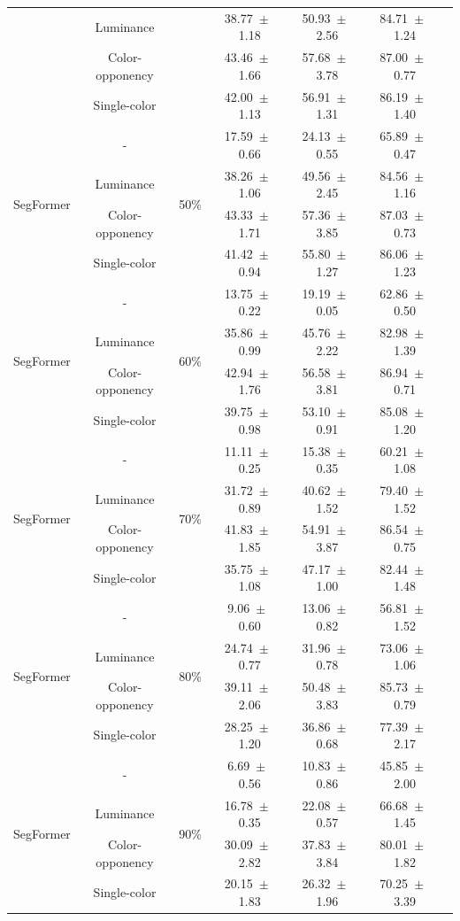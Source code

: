 \begin{table}[h]
\begin{tabular}{@{}lccc ccc@{}}
& Luminance & & 38.77~$\pm$~1.18 & 50.93~$\pm$~2.56 & 84.71~$\pm$~1.24 \\
& Color-opponency & & 43.46~$\pm$~1.66 & 57.68~$\pm$~3.78 & 87.00~$\pm$~0.77 \\
& Single-color & & 42.00~$\pm$~1.13 & 56.91~$\pm$~1.31 & 86.19~$\pm$~1.40 \\
\midrule
\multirow{4}{*}{SegFormer} & - & \multirow{4}{*}{50\%} & 17.59~$\pm$~0.66 & 24.13~$\pm$~0.55 & 65.89~$\pm$~0.47 \\
& Luminance & & 38.26~$\pm$~1.06 & 49.56~$\pm$~2.45 & 84.56~$\pm$~1.16 \\
& Color-opponency & & 43.33~$\pm$~1.71 & 57.36~$\pm$~3.85 & 87.03~$\pm$~0.73 \\
& Single-color & & 41.42~$\pm$~0.94 & 55.80~$\pm$~1.27 & 86.06~$\pm$~1.23 \\
\midrule
\multirow{4}{*}{SegFormer} & - & \multirow{4}{*}{60\%} & 13.75~$\pm$~0.22 & 19.19~$\pm$~0.05 & 62.86~$\pm$~0.50 \\
& Luminance & & 35.86~$\pm$~0.99 & 45.76~$\pm$~2.22 & 82.98~$\pm$~1.39 \\
& Color-opponency & & 42.94~$\pm$~1.76 & 56.58~$\pm$~3.81 & 86.94~$\pm$~0.71 \\
& Single-color & & 39.75~$\pm$~0.98 & 53.10~$\pm$~0.91 & 85.08~$\pm$~1.20 \\
\midrule
\multirow{4}{*}{SegFormer} & - & \multirow{4}{*}{70\%} & 11.11~$\pm$~0.25 & 15.38~$\pm$~0.35 & 60.21~$\pm$~1.08 \\
& Luminance & & 31.72~$\pm$~0.89 & 40.62~$\pm$~1.52 & 79.40~$\pm$~1.52 \\
& Color-opponency & & 41.83~$\pm$~1.85 & 54.91~$\pm$~3.87 & 86.54~$\pm$~0.75 \\
& Single-color & & 35.75~$\pm$~1.08 & 47.17~$\pm$~1.00 & 82.44~$\pm$~1.48 \\
\midrule
\multirow{4}{*}{SegFormer} & - & \multirow{4}{*}{80\%} & 9.06~$\pm$~0.60 & 13.06~$\pm$~0.82 & 56.81~$\pm$~1.52 \\
& Luminance & & 24.74~$\pm$~0.77 & 31.96~$\pm$~0.78 & 73.06~$\pm$~1.06 \\
& Color-opponency & & 39.11~$\pm$~2.06 & 50.48~$\pm$~3.83 & 85.73~$\pm$~0.79 \\
& Single-color & & 28.25~$\pm$~1.20 & 36.86~$\pm$~0.68 & 77.39~$\pm$~2.17 \\
\midrule
\multirow{4}{*}{SegFormer} & - & \multirow{4}{*}{90\%} & 6.69~$\pm$~0.56 & 10.83~$\pm$~0.86 & 45.85~$\pm$~2.00 \\
& Luminance & & 16.78~$\pm$~0.35 & 22.08~$\pm$~0.57 & 66.68~$\pm$~1.45 \\
& Color-opponency & & 30.09~$\pm$~2.82 & 37.83~$\pm$~3.84 & 80.01~$\pm$~1.82 \\
& Single-color & & 20.15~$\pm$~1.83 & 26.32~$\pm$~1.96 & 70.25~$\pm$~3.39 \\
\midrule
\bottomrule
\end{tabular}
\label{tab:sparse_results_segformer_acdc_rain}
\end{table}